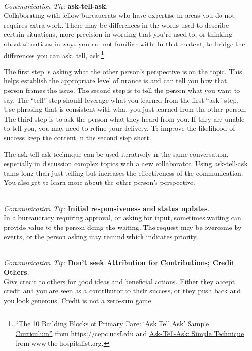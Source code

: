 \ \\
\textit{Communication Tip}: \textbf{ask-tell-ask}.\\
Collaborating with fellow bureaucrats who have expertise in areas you do not requires extra work. There may be differences in the words used to describe certain situations, more precision in wording that you're used to, or thinking about situations in ways you are not familiar with. In that context, to bridge the differences you can ask, tell, ask.\footnote{\href{https://cepc.ucsf.edu/sites/cepc.ucsf.edu/files/Curriculum_sample_14-0602.pdf}{``The 10 Building Blocks of Primary Care: `Ask Tell Ask' Sample Curriculum''} from https://cepc.ucsf.edu and \href{https://www.the-hospitalist.org/hospitalist/article/125126/qi-initiatives/ask-tell-ask-simple-technique-can-help-hospitalists}{Ask-Tell-Ask: Simple Technique} from www.the-hospitalist.org.} 

The first step is asking what the other person's perspective is on the topic. This helps establish the appropriate level of nuance is and can tell you how that person frames the issue. The second step is to tell the person what you want to say. The ``tell'' step should leverage what you learned from the first ``ask'' step. Use phrasing that is consistent with what you just learned from the other person. The third step is to ask the person what they heard from you. If they are unable to tell you, you may need to refine your delivery. To improve the likelihood of success keep the content in the second step short. 

The ask-tell-ask technique can be used iteratively in the same conversation, especially in discussion complex topics with a new collaborator. 
Using ask-tell-ask takes long than just telling but increases the effectiveness of the communication. You also get to learn more about the other person's perspective. 

\ \\
\textit{Communication Tip}: \textbf{Initial responsiveness and status updates}.\\
In a bureaucracy requiring approval, or asking for input, sometimes waiting can provide value to the person doing the waiting. The request may be overcome by events, or the person asking may remind which indicates priority.

\ \\
\textit{Communication Tip}: \textbf{Don't seek Attribution for Contributions; Credit Others\label{sec:credit-others}}.\\
Give credit to others for good ideas and beneficial actions. Either they accept credit and you are seen as a contributor to their success, or they push back and you look generous. Credit is not a \href{https://en.wikipedia.org/wiki/Zero-sum_game}{zero-sum game}.

